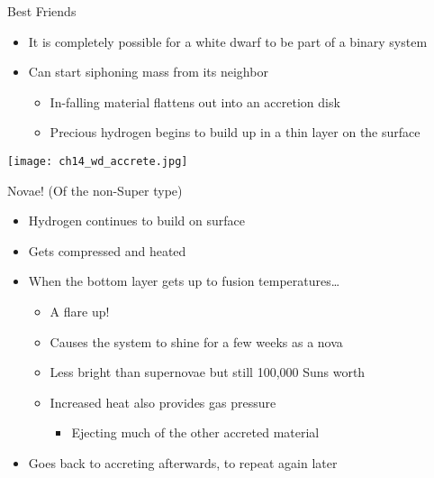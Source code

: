 \documentclass[pdf,aspectratio=169]{beamer}
\begin{document}
\begin{frame}{Best Friends}
  \begin{itemize}
	\item It is completely possible for a white dwarf to be part of a binary system
	\item Can start siphoning mass from its neighbor
	  \begin{itemize}
		\item In-falling material flattens out into an accretion disk
		\item Precious hydrogen begins to build up in a thin layer on the surface
	  \end{itemize}
  \end{itemize}
  \begin{center}
	\texttt{[image: ch14\_wd\_accrete.jpg]}
  \end{center}
\end{frame}

\begin{frame}{Novae! \footnotesize (Of the non-Super type)}
  \begin{itemize}
	\item Hydrogen continues to build on surface
	\item Gets compressed and heated
	\item When the bottom layer gets up to fusion temperatures\ldots
	  \begin{itemize}
		\item A flare up!
		\item Causes the system to shine for a few weeks as a \alert{nova}
		\item Less bright than supernovae but still 100,000 Suns worth
		\item Increased heat also provides gas pressure
		  \begin{itemize}
			\item Ejecting much of the other accreted material
		  \end{itemize}
	  \end{itemize}
	\item Goes back to accreting afterwards, to repeat again later
  \end{itemize}
\end{frame}
\end{document}
